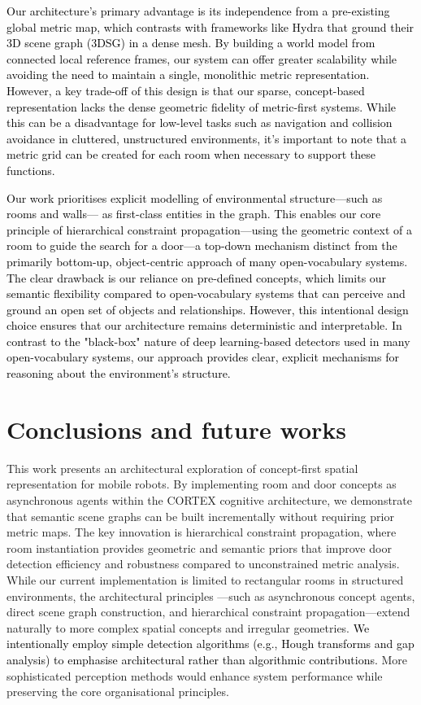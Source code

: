 \documentclass[10pt,a4paper]{article}
\begin{document}
\textcolor{black}{Our architecture's primary advantage is its independence from a pre-existing global metric map, which contrasts with frameworks like Hydra that ground their 3D scene graph (3DSG) in a dense mesh. By building a world model from connected local reference frames, \textcolor{black}{our system can offer greater scalability while avoiding the need to maintain a single, monolithic metric representation.} However, a key trade-off of this design is that our sparse, concept-based representation lacks the dense geometric fidelity of metric-first systems. While this can be a disadvantage for low-level tasks such as navigation and collision avoidance in cluttered, unstructured environments, it's important to note that a metric grid can be created for each room when necessary to support these functions.}

\textcolor{black}{Our work prioritises \textcolor{black}{explicit modelling of environmental structure—such as rooms and walls—} as first-class entities in the graph. This enables our core principle of hierarchical constraint propagation—using the geometric context of a room to guide the search for a door—a top-down mechanism distinct from the primarily bottom-up, object-centric approach of many open-vocabulary systems. The clear drawback is our reliance on pre-defined concepts, which limits our semantic flexibility compared to open-vocabulary systems that can perceive and ground an open set of objects and relationships. However, this intentional design choice ensures that our architecture remains deterministic and interpretable. In contrast to the "black-box" nature of deep learning-based detectors used in many open-vocabulary systems, our approach provides clear, explicit mechanisms for reasoning about the environment's structure.}

\section{Conclusions and future works}

%
%

This work presents an architectural exploration of concept-first spatial representation for mobile robots. By implementing room and door concepts as asynchronous agents within the CORTEX cognitive architecture, we demonstrate that semantic scene graphs can be built incrementally without requiring prior metric maps. The key innovation is hierarchical constraint propagation, where room instantiation provides geometric and semantic priors that improve door detection efficiency and robustness compared to unconstrained metric analysis.
While our current implementation is limited to rectangular rooms in structured environments, the architectural principles —such as asynchronous concept agents, direct scene graph construction, and hierarchical constraint propagation—extend naturally to more complex spatial concepts and irregular geometries. \textcolor{black}{We intentionally employ simple detection algorithms (e.g., Hough transforms and gap analysis) to emphasise architectural rather than algorithmic contributions.} More sophisticated perception methods would enhance system performance while preserving the core organisational principles.
\end{document}
